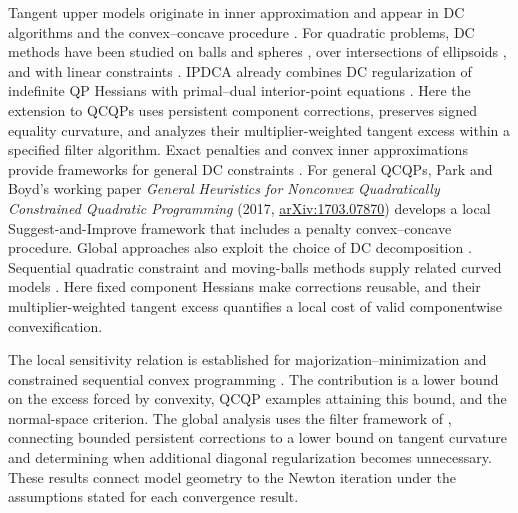 \documentclass[pdflatex,sn-mathphys-num]{sn-jnl}
\theoremstyle{thmstyleone}
\theoremstyle{thmstylethree}
\newcounter{algorithm}
\begin{document}
Tangent upper models originate in inner approximation
\citep{MarksWright1978} and appear in DC algorithms and the
convex--concave procedure \citep{LeThiPhamDinh2018,LippBoyd2016}.
For quadratic problems, DC methods have been studied on balls and spheres
\citep{PhamDinhLeThi1996,PhamDinhLeThi1998}, over intersections of
ellipsoids \citep{LeThi2000Ellipsoids}, and with linear constraints
\citep{LeThiPhamDinhYen2011}. IPDCA already combines DC regularization
of indefinite QP Hessians with primal--dual interior-point equations
\citep{Akoa2005Thesis,PhamDinhLeThiAkoa2008}. Here the extension to QCQPs
uses persistent component corrections, preserves signed equality curvature,
and analyzes their multiplier-weighted tangent excess within a specified
filter algorithm.
Exact penalties and convex inner approximations provide frameworks for
general DC constraints
\citep{LeThiPhamDinhHuynh2012,LeThiHuynhPhamDinh2014,LuSunZhou2022}.
For general QCQPs, Park and Boyd's working paper
\emph{General Heuristics for Nonconvex Quadratically Constrained Quadratic
Programming} (2017, \href{https://arxiv.org/abs/1703.07870}{arXiv:1703.07870})
develops a local Suggest-and-Improve framework that includes a penalty
convex--concave procedure.
Global approaches also exploit the choice of DC decomposition
\citep{VanVoorhisAlKhayyal2003,ZhengSunLi2011}.
Sequential quadratic constraint and moving-balls methods supply related
curved models \citep{FukushimaLuoTseng2003,Solodov2004,AuslenderShefiTeboulle2010}.
Here fixed component Hessians make corrections reusable, and their
multiplier-weighted tangent excess quantifies a local cost of valid
componentwise convexification.

The local sensitivity relation is established for majorization--minimization
\citep[Section~6.1]{HunterLange2004} and constrained sequential convex
programming \citep[Theorem~4.5]{MessererBaumgaertnerDiehl2021}.
The contribution is a lower bound on the excess forced by convexity,
QCQP examples attaining this bound, and the normal-space criterion. The global analysis uses the filter
framework of \citet{WachterBiegler2005Global}, connecting bounded
persistent corrections to a lower bound on tangent curvature and determining
when additional diagonal regularization becomes unnecessary. These results connect model
geometry to the Newton iteration under the assumptions stated for
each convergence result.
\end{document}
